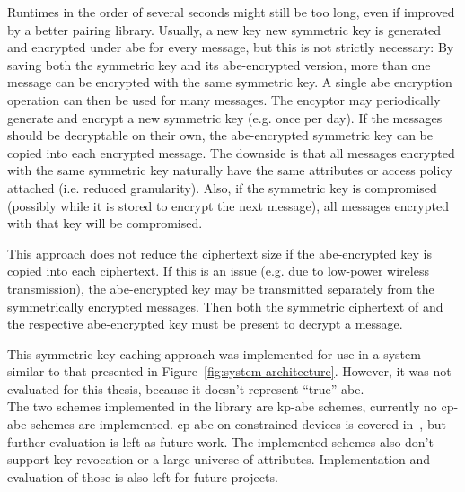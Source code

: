 Runtimes in the order of several seconds might still be too long, even if improved by a better pairing library.
Usually, a new key new symmetric key is generated and encrypted under \acrshort{abe} for every message, but this is not strictly necessary:
By saving both the symmetric key and its \acrshort{abe}-encrypted version, more than one message can be encrypted with the same symmetric key.
A single \acrshort{abe} encryption operation can then be used for many messages.
The encyptor may periodically generate and encrypt a new symmetric key (e.g. once per day).
If the messages should be decryptable on their own, the \acrshort{abe}-encrypted symmetric key can be copied into each encrypted message.
The downside is that all messages encrypted with the same symmetric key naturally have the same attributes or access policy attached (i.e. reduced granularity).
Also, if the symmetric key is compromised (possibly while it is stored to encrypt the next message), all messages encrypted with that key will be compromised.

This approach does not reduce the ciphertext size if the \acrshort{abe}-encrypted key is copied into each ciphertext.
If this is an issue (e.g. due to low-power wireless transmission), the \acrshort{abe}-encrypted key may be transmitted separately from the symmetrically encrypted messages.
Then both the symmetric ciphertext of and the respective \acrshort{abe}-encrypted key must be present to decrypt a message.

This symmetric key-caching approach was implemented for use in a system similar to that presented in Figure~\ref{fig:system-architecture}.
However, it was not evaluated for this thesis, because it doesn't represent ``true'' \acrlong{abe}.
~\\

The two schemes implemented in the library are \acrshort{kp-abe} schemes, currently no \acrshort{cp-abe} schemes are implemented.
\acrshort{cp-abe} on constrained devices is covered in~\cite{borgh_attribute-based_2016}, but further evaluation is left as future work.
The implemented schemes also don't support key revocation or a \gls{large-universe} of attributes. 
Implementation and evaluation of those is also left for future projects.
